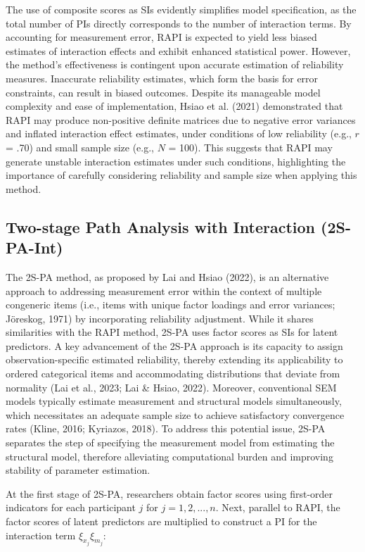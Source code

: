 \documentclass[
  man,mask]{apa6}
\begin{document}
The use of composite scores as SIs evidently simplifies model specification, as the total number of PIs directly corresponds to the number of interaction terms. By accounting for measurement error, RAPI is expected to yield less biased estimates of interaction effects and exhibit enhanced statistical power. However, the method's effectiveness is contingent upon accurate estimation of reliability measures. Inaccurate reliability estimates, which form the basis for error constraints, can result in biased outcomes. Despite its manageable model complexity and ease of implementation, Hsiao et al. (2021) demonstrated that RAPI may produce non-positive definite matrices due to negative error variances and inflated interaction effect estimates, under conditions of low reliability (e.g., \(\textit{r}\) = .70) and small sample size (e.g., \(\textit{N}\) = 100). This suggests that RAPI may generate unstable interaction estimates under such conditions, highlighting the importance of carefully considering reliability and sample size when applying this method.

\subsection{Two-stage Path Analysis with Interaction (2S-PA-Int)}\label{two-stage-path-analysis-with-interaction-2s-pa-int}

The 2S-PA method, as proposed by Lai and Hsiao (2022), is an alternative approach to addressing measurement error within the context of multiple congeneric items (i.e., items with unique factor loadings and error variances; Jöreskog, 1971) by incorporating reliability adjustment. While it shares similarities with the RAPI method, 2S-PA uses factor scores as SIs for latent predictors. A key advancement of the 2S-PA approach is its capacity to assign observation-specific estimated reliability, thereby extending its applicability to ordered categorical items and accommodating distributions that deviate from normality (Lai et al., 2023; Lai \& Hsiao, 2022). Moreover, conventional SEM models typically estimate measurement and structural models simultaneously, which necessitates an adequate sample size to achieve satisfactory convergence rates (Kline, 2016; Kyriazos, 2018). To address this potential issue, 2S-PA separates the step of specifying the measurement model from estimating the structural model, therefore alleviating computational burden and improving stability of parameter estimation.

At the first stage of 2S-PA, researchers obtain factor scores using first-order indicators for each participant \(j\) for \(j = 1, 2, ..., n\). Next, parallel to RAPI, the factor scores of latent predictors are multiplied to construct a PI for the interaction term \(\xi_{x_{j}}\xi_{m_{j}}\):
\end{document}
